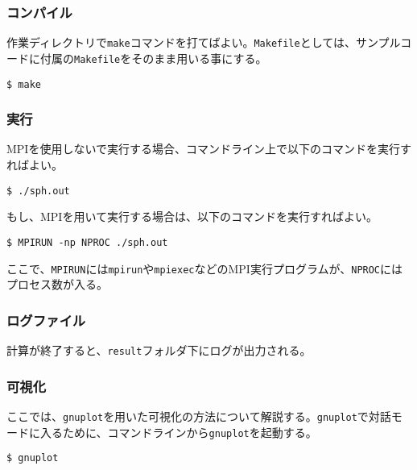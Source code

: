 \subsubsection{コンパイル}
作業ディレクトリで\texttt{make}コマンドを打てばよい。\texttt{Makefile}としては、サンプルコードに付属の\texttt{Makefile}をそのまま用いる事にする。
\begin{screen}
\begin{verbatim}
$ make
\end{verbatim}
\end{screen}

\subsubsection{実行}
MPIを使用しないで実行する場合、コマンドライン上で以下のコマンドを実行すればよい。
\begin{screen}
\begin{verbatim}
$ ./sph.out
\end{verbatim}
\end{screen}
もし、MPIを用いて実行する場合は、以下のコマンドを実行すればよい。
\begin{screen}
\begin{verbatim}
$ MPIRUN -np NPROC ./sph.out
\end{verbatim}
\end{screen}
ここで、\texttt{MPIRUN}には\texttt{mpirun}や\texttt{mpiexec}などのMPI実行プログラムが、\texttt{NPROC}にはプロセス数が入る。

\subsubsection{ログファイル}
計算が終了すると、\texttt{result}フォルダ下にログが出力される。

\subsubsection{可視化}
ここでは、\texttt{gnuplot}を用いた可視化の方法について解説する。\texttt{gnuplot}で対話モードに入るために、コマンドラインから\texttt{gnuplot}を起動する。
\begin{screen}
\begin{verbatim}
$ gnuplot
\end{verbatim}
\end{screen}

